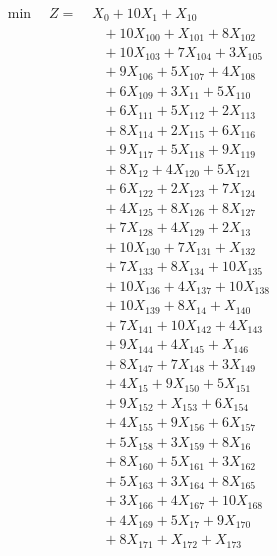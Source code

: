 \documentclass[a4paper,10pt]{article}
\begin{document}
\allowdisplaybreaks
{\small
\begin{align}
\min \quad Z = &\; X_{0} + 10X_{1} + X_{10} \\[0.5ex]
&\quad  + 10X_{100} + X_{101} + 8X_{102} \\[0.5ex]
&\quad  + 10X_{103} + 7X_{104} + 3X_{105} \\[0.5ex]
&\quad  + 9X_{106} + 5X_{107} + 4X_{108} \\[0.5ex]
&\quad  + 6X_{109} + 3X_{11} + 5X_{110} \\[0.5ex]
&\quad  + 6X_{111} + 5X_{112} + 2X_{113} \\[0.5ex]
&\quad  + 8X_{114} + 2X_{115} + 6X_{116} \\[0.5ex]
&\quad  + 9X_{117} + 5X_{118} + 9X_{119} \\[0.5ex]
&\quad  + 8X_{12} + 4X_{120} + 5X_{121} \\[0.5ex]
&\quad  + 6X_{122} + 2X_{123} + 7X_{124} \\[0.5ex]
&\quad  + 4X_{125} + 8X_{126} + 8X_{127} \\[0.5ex]
&\quad  + 7X_{128} + 4X_{129} + 2X_{13} \\[0.5ex]
&\quad  + 10X_{130} + 7X_{131} + X_{132} \\[0.5ex]
&\quad  + 7X_{133} + 8X_{134} + 10X_{135} \\[0.5ex]
&\quad  + 10X_{136} + 4X_{137} + 10X_{138} \\[0.5ex]
&\quad  + 10X_{139} + 8X_{14} + X_{140} \\[0.5ex]
&\quad  + 7X_{141} + 10X_{142} + 4X_{143} \\[0.5ex]
&\quad  + 9X_{144} + 4X_{145} + X_{146} \\[0.5ex]
&\quad  + 8X_{147} + 7X_{148} + 3X_{149} \\[0.5ex]
&\quad  + 4X_{15} + 9X_{150} + 5X_{151} \\[0.5ex]
&\quad  + 9X_{152} + X_{153} + 6X_{154} \\[0.5ex]
&\quad  + 4X_{155} + 9X_{156} + 6X_{157} \\[0.5ex]
&\quad  + 5X_{158} + 3X_{159} + 8X_{16} \\[0.5ex]
&\quad  + 8X_{160} + 5X_{161} + 3X_{162} \\[0.5ex]
&\quad  + 5X_{163} + 3X_{164} + 8X_{165} \\[0.5ex]
&\quad  + 3X_{166} + 4X_{167} + 10X_{168} \\[0.5ex]
&\quad  + 4X_{169} + 5X_{17} + 9X_{170} \\[0.5ex]
&\quad  + 8X_{171} + X_{172} + X_{173} \\[0.5ex]

\end{align}}
\end{document}
